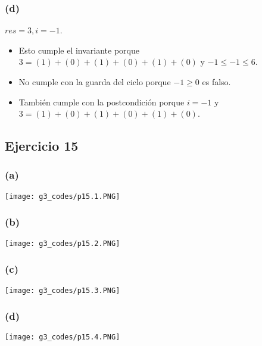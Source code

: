 \documentclass[12 pt]{article}
\begin{document}
    \subsubsection*{(d)}
        $res = 3, i = -1$. 
        \begin{itemize}
            \item Esto cumple el invariante porque $3 = (1)+(0)+(1)+(0)+(1)+(0)$ y $-1 \leq -1 \leq 6$.
            \item No cumple con la guarda del ciclo porque $-1 \geq 0$ es falso.
            \item También cumple con la postcondición porque $i = -1$ y $3 = (1)+(0)+(1)+(0)+(1)+(0)$.
        \end{itemize}

\subsection*{Ejercicio 15}
    \subsubsection*{(a)}
        \begin{center}
            \texttt{[image: g3\_codes/p15.1.PNG]}
        \end{center}
    \subsubsection*{(b)}
        \begin{center}
            \texttt{[image: g3\_codes/p15.2.PNG]}
        \end{center}
    \subsubsection*{(c)}
        \begin{center}
            \texttt{[image: g3\_codes/p15.3.PNG]}
        \end{center}
    \subsubsection*{(d)}
        \begin{center}
            \texttt{[image: g3\_codes/p15.4.PNG]}
        \end{center}
\end{document}
